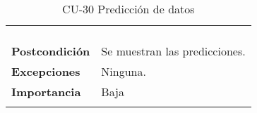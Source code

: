 \begin{longtable}[t]{@{}ll@{}}
\begin{minipage}[t]{0.71\columnwidth}
\begin{enumerate}
\end{enumerate}\strut
\end{minipage}\tabularnewline
\begin{minipage}[t]{0.23\columnwidth}\raggedright\strut
\textbf{Postcondición}\strut
\end{minipage} & \begin{minipage}[t]{0.71\columnwidth}\raggedright\strut
Se muestran las predicciones.\strut
\end{minipage}\tabularnewline
\begin{minipage}[t]{0.23\columnwidth}\raggedright\strut
\textbf{Excepciones}\strut
\end{minipage} & \begin{minipage}[t]{0.71\columnwidth}\raggedright\strut
Ninguna. \strut
\end{minipage}\tabularnewline
\begin{minipage}[t]{0.23\columnwidth}\raggedright\strut
\textbf{Importancia}\strut
\end{minipage} & \begin{minipage}[t]{0.71\columnwidth}\raggedright\strut
Baja\strut
\end{minipage}\tabularnewline
\bottomrule
\caption{CU-30 Predicción de datos}
\end{longtable}

